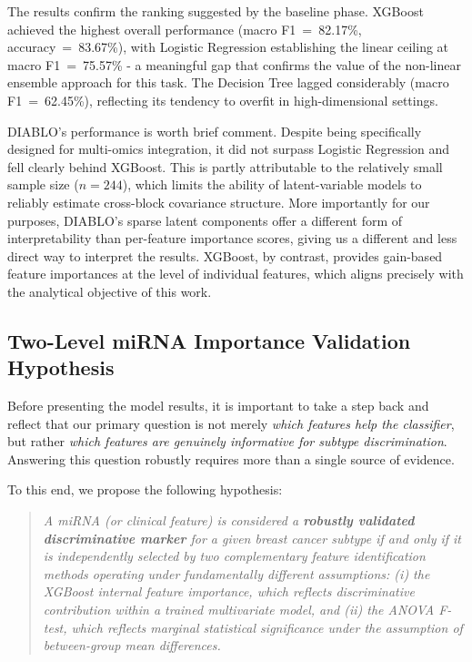 The results confirm the ranking suggested by the baseline phase. 
XGBoost achieved the highest overall performance (macro F1~=~82.17\%, 
accuracy~=~83.67\%), with Logistic Regression establishing the linear 
ceiling at macro F1~=~75.57\% - a meaningful gap that confirms the 
value of the non-linear ensemble approach for this task. The Decision 
Tree lagged considerably (macro F1~=~62.45\%), reflecting its tendency 
to overfit in high-dimensional settings.
 
DIABLO's performance is worth brief comment. Despite being specifically designed for
multi-omics integration, it did not surpass Logistic Regression and fell clearly
behind XGBoost. This is partly attributable to the relatively small sample size
($n = 244$), which limits the ability of latent-variable models to reliably estimate
cross-block covariance structure. More importantly for our purposes, DIABLO's sparse
latent components offer a different form of interpretability than per-feature importance
scores, giving us a different and less direct way to interpret the results. XGBoost, by contrast, provides gain-based feature importances at the level
of individual features, which aligns precisely with the analytical objective of this work.

\subsection{Two-Level miRNA Importance Validation Hypothesis}
\label{sec:validation-hypothesis}

Before presenting the model results, it is important to take a step back and 
reflect that our primary question is not merely
\textit{which features help the classifier}, but rather \textit{which features are genuinely
informative for subtype discrimination}. Answering this question robustly requires more than
a single source of evidence.

To this end, we propose the following hypothesis:

\begin{quote}
\textit{A miRNA (or clinical feature) is considered a \textbf{robustly validated discriminative
marker} for a given breast cancer subtype if and only if it is independently selected by two
complementary feature identification methods operating under fundamentally different assumptions:
(i) the XGBoost internal feature importance, which reflects discriminative contribution within
a trained multivariate model, and (ii) the ANOVA F-test, which reflects marginal statistical
significance under the assumption of between-group mean differences.}
\end{quote}


